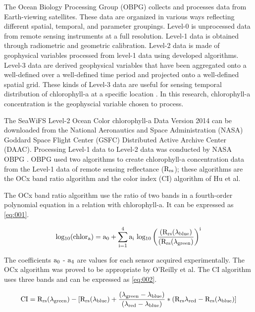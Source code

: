 The Ocean Biology Processing Group (OBPG) collects and processes data from Earth-viewing satellites. These data are organized in various ways reflecting different spatial, temporal, and parameter groupings. Level-0 is unprocessed data from remote sensing instruments at a full resolution. Level-1 data is obtained through radiometric and geometric calibration. Level-2 data is made of geophysical variables processed from level-1 data using developed algorithms. Level-3 data are derived geophysical variables that have been aggregated onto a well-defined over a well-defined time period and projected onto a well-defined spatial grid. These kinds of Level-3 data are useful for sensing temporal distribution of chlorophyll-a at a specific location \cite{feldman2017ocean}. In this research, chlorophyll-a concentration is the geophyscial variable chosen to process.

The SeaWiFS Level-2 Ocean Color chlorophyll-a Data Version 2014 can be downloaded from the National Aeronautics and Space Administration (NASA) Goddard Space Flight Center (GSFC) Distributed Active Archive Center (DAAC). Processing Level-1 data to Level-2 data was conducted by NASA OBPG \cite{NASASeaFiWSdata}. OBPG used two algorithms to create chlorophyll-a concentration data from the Level-1 data of remote sensing reflectance ($\rm R_{rs}$); these algorithms are the OCx band ratio algorithm and the color index (CI) algorithm of Hu et al\cite{hu2012chlorophyll}. 

The OCx band ratio algorithm use the ratio of two bands in a fourth-order polynomial equation in a relation with chlorophyll-a. It can be expressed as \eqref{eq:001}.
 
 \begin{equation}
 {\rm log_{10} (chlor_a) = a_0 + \sum_{i=1}^4 a_i ~ log_{10} \left( \frac{(R_{rs}(\lambda_{blue})}{(R_{rs}(\lambda_{green})} \right) ^i }
 \label{eq:001}
 \end{equation}
 
The coefficients $\rm a_0$ - $\rm a_4$ are values for each sensor acquired experimentally. The OCx algorithm was proved to be appropriate by O’Reilly et al\cite{o2000ocean}. The CI algorithm uses three bands and can be expressed as \eqref{eq:002}.

 \begin{equation}
{\rm CI = R_{rs} ({\lambda}_{green}) - [R_{rs} ({\lambda}_{blue}) + \frac {({\lambda}_{green} - {\lambda}_{blue})} {({\lambda}_{red} - {\lambda}_{blue})} * (R_{rs}{\lambda}_{red} - R_{rs} ({\lambda}_{blue}) ]}
\label{eq:002}
\end{equation}

